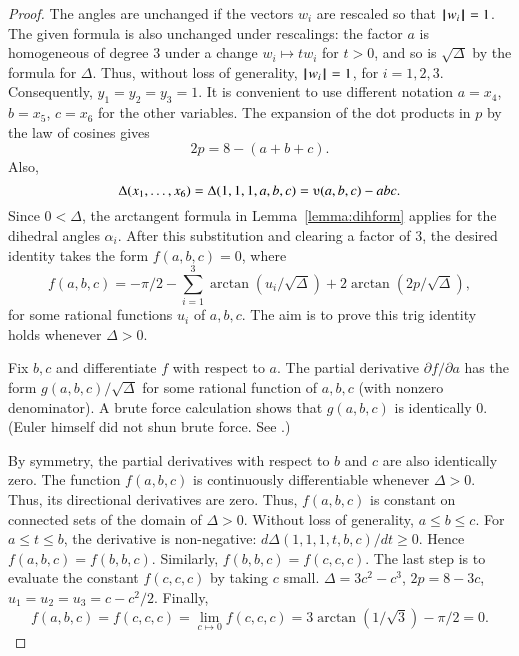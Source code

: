 \begin{proof}
The angles are unchanged if the vectors $w_i$ are rescaled so that
${{\hskip0.1em|\hskip-0.15em|\hskip0.1em}w_i{\hskip0.1em|\hskip-0.15em|\hskip0.1em}}=1$.  The given formula is also unchanged under rescalings:
the factor $a$ is homogeneous of degree $3$ under a change $w_i
\mapsto t w_i$ for $t>0$, and so is $\sqrt{\Delta}$ by the
formula for $\Delta$.  Thus, without loss of generality, ${{\hskip0.1em|\hskip-0.15em|\hskip0.1em}w_i{\hskip0.1em|\hskip-0.15em|\hskip0.1em}}=1$, for
$i=1,2,3$.  Consequently, $y_1=y_2=y_3=1$.  It is convenient to use
different notation $a=x_4$, $b=x_5$, $c=x_6$ for the other
variables. The expansion of the dot products in $p$ by the law of cosines
gives
    $$2 p = 8 - (a+b+c).$$
Also, $$\Delta(x_1,\ldots,x_6) = \Delta(1,1,1,a,b,c) =
    \ups(a,b,c) - a b c.$$
Since $0 <\Delta$, the arctangent formula
in Lemma~\ref{lemma:dihform} 
applies for the dihedral angles $\alpha_i$.  After
this substitution and clearing a factor of $3$,  %
the desired identity takes the form $f(a,b,c)=0$, where
    $$
    f(a,b,c)= -\pi/2 - \sum_{i=1}^3\arctan(u_i/\sqrt{\Delta}) +
    2\arctan(2 p/\sqrt{\Delta}),
    $$
for some rational functions $u_i$ of $a,b,c$.   The aim is to prove this trig identity holds whenever $\Delta>0$.

Fix $b,c$ and differentiate $f$ with respect
to $a$.  The partial derivative $\partial f/\partial a$ has the form
$g(a,b,c)/\sqrt{\Delta}$ for some rational function of $a,b,c$ (with
nonzero denominator).  A brute force calculation shows that $g(a,b,c)$ is
identically $0$.  (Euler himself did not shun brute force.  See
\cite{Euler}.)

By symmetry, the partial derivatives with respect to $b$ and $c$ are
also identically zero.  The function $f(a,b,c)$  is continuously
differentiable whenever $\Delta>0$.  Thus, its directional
derivatives are zero.  Thus, $f(a,b,c)$ is constant on connected
sets of the domain of $\Delta>0$.  Without loss of generality, $a\le b\le c$.  For $a\le t\le b$,  the derivative is non-negative:
$d\Delta(1,1,1,t,b,c)/dt\ge 0$. Hence $f(a,b,c)=f(b,b,c)$. 
Similarly,
 $f(b,b,c)=f(c,c,c)$. 
The last step is to evaluate the constant $f(c,c,c)$
by taking $c$ small.
$\Delta=3c^2-c^3$, $2p= 8-3c$,  $u_1=u_2=u_3 = c -c^2/2$.   Finally,
    $$f(a,b,c)= f(c,c,c) = \lim_{c\mapsto0} f(c,c,c) = 
    3 \arctan(1/\sqrt3)-\pi/2 =0.$$
\end{proof}






